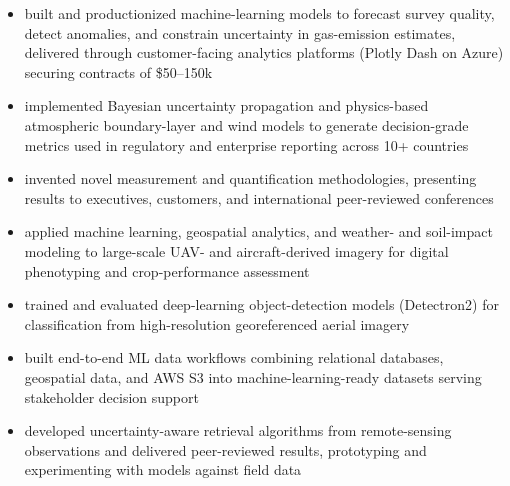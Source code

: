\documentclass[10pt,a4paper,withhyper]{altacv}
\renewcommand{\divider}{%
  \vspace{-0.15\baselineskip}%
  \textcolor{body!25}{\hdashrule{\linewidth}{0.4pt}{0.8ex}}%
  \vspace{2pt}%
}
\begin{document}
\begin{itemize}
\item built and productionized machine-learning models to forecast survey quality, detect anomalies, and constrain uncertainty in gas-emission estimates, delivered through customer-facing analytics platforms (Plotly Dash on Azure) securing contracts of \$50--150k
\item implemented Bayesian uncertainty propagation and physics-based atmospheric boundary-layer and wind models to generate decision-grade metrics used in regulatory and enterprise reporting across 10+ countries
\item invented novel measurement and quantification methodologies, presenting results to executives, customers, and international peer-reviewed conferences
\end{itemize}

\divider

\begin{itemize}
\item applied machine learning, geospatial analytics, and weather- and soil-impact modeling to large-scale UAV- and aircraft-derived imagery for digital phenotyping and crop-performance assessment
\item trained and evaluated deep-learning object-detection models (Detectron2) for classification from high-resolution georeferenced aerial imagery
\item built end-to-end ML data workflows combining relational databases, geospatial data, and AWS S3 into machine-learning-ready datasets serving stakeholder decision support
\end{itemize}

\divider

\begin{itemize}
\item developed uncertainty-aware retrieval algorithms from remote-sensing observations and delivered peer-reviewed results, prototyping and experimenting with models against field data
\end{itemize}


\newpage
{}
~{\href{https://github.com/kyledawson/bess-optimizer}{}}
\end{document}
